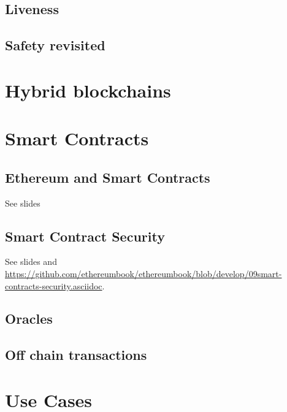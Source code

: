 \documentclass[a4paper,11pt]{report}
\begin{document}
	\section{Liveness}
	\label{sec:live}
	
	
	\section{Safety revisited}
	\label{sec:safe2}
	

\chapter{Hybrid blockchains}
	\label{ch:hybrid}
	

\chapter{Smart Contracts}

	\section{Ethereum and Smart Contracts}
	See slides 

	\section{Smart Contract Security}
	See slides and \url{https://github.com/ethereumbook/ethereumbook/blob/develop/09smart-contracts-security.asciidoc}.
	
	\section{Oracles}
	
	\section{Off chain transactions}


\chapter{Use Cases}
	\label{ch:useCases}
	
\end{document}
